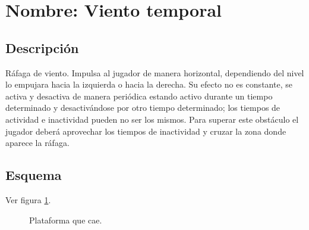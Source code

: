 		\section{Nombre: Viento temporal}\label{obs.vientoT}
	\subsection{Descripción}
	Ráfaga de viento. Impulsa al jugador de manera horizontal, dependiendo del nivel lo empujara hacia la izquierda o hacia la derecha. Su efecto no es constante, se activa y desactiva de manera periódica estando activo durante un tiempo determinado y desactivándose por otro tiempo determinado; los tiempos de actividad e inactividad pueden no ser los mismos. Para superar este obstáculo el jugador deberá aprovechar los tiempos de inactividad y cruzar la zona donde aparece la ráfaga.
	\subsection{Esquema}
Ver figura \ref{fig:vientoT}.
	\begin{figure}
  \centering
  \caption{Plataforma que cae.}
  \label{fig:vientoT}
\end{figure} 
